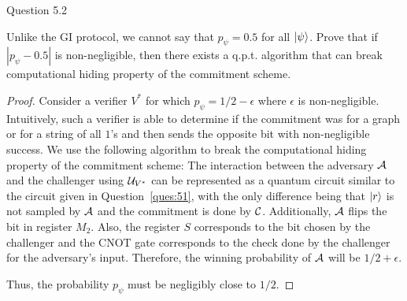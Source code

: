 \begin{solution}{Question 5.2}\label{ques:52}
    \begin{question}
        Unlike the GI protocol, we cannot say that $p_\psi = 0.5$ for all $\ket{\psi}$. Prove that if $|p_\psi - 0.5|$ is non-negligible, then there exists a q.p.t. algorithm that can break computational hiding property of the commitment scheme.
    \end{question}
    \tcblower{}
    \begin{proof}
        Consider a verifier $V^*$ for which $p_\psi = 1/2-\epsilon$ where $\epsilon$ is non-negligible. Intuitively, such a verifier is able to determine if the commitment was for a graph or for a string of all $1$'s and then sends the opposite bit with non-negligible success. We use the following algorithm to break the computational hiding property of the commitment scheme:
        The interaction between the adversary $\mathcal{A}$ and the challenger using $\mathcal{U}_{V^*}$ can be represented as a quantum circuit similar to the circuit given in Question~\ref{ques:51}, with the only difference being that $\ket{r}$ is not sampled by $\mathcal{A}$ and the commitment is done by $\mathcal{C}$. Additionally, $\mathcal{A}$ flips the bit in register $M_2$. Also, the register $S$ corresponds to the bit chosen by the challenger and the CNOT gate corresponds to the check done by the challenger for the adversary's input. Therefore, the winning probability of $\mathcal{A}$ will be $1/2+\epsilon$.\par
        Thus, the probability $p_\psi$ must be negligibly close to $1/2$.
    \end{proof}
\end{solution}
